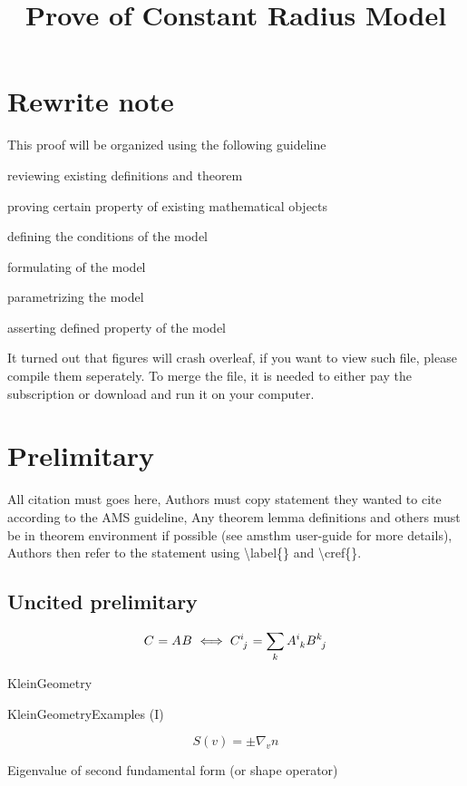 \documentclass[stu, babel, american, biblatex, a4paper, draftall]{apa7}
\title{Prove of Constant Radius Model}
\begin{document}
\maketitle
\tableofcontents

\section{Rewrite note}
This proof will be organized using the following guideline
\begin{APAenumerate}
    \item reviewing existing definitions and theorem
    \item proving certain property of existing mathematical objects
    \item defining the conditions of the model
    \item formulating of the model
    \item parametrizing the model
    \item asserting defined property of the model
\end{APAenumerate}
It turned out that figures will crash overleaf, if you want to view such file, please compile them seperately.
To merge the file, it is needed to either pay the subscription or download and run it on your computer.

\section{Prelimitary}
All citation must goes here,
Authors must copy statement they wanted to cite according to the AMS guideline,
Any theorem lemma definitions and others must be in theorem environment if possible (see amsthm user-guide for more details),
Authors then refer to the statement using {\textbackslash}label\{\} and {\textbackslash}cref\{\}.
\subsection{Uncited prelimitary}
\begin{equation}\label{MatrixMultiplication}
    \tensor{C}{}=\tensor{A}{}\tensor{B}{}
    \iff
    \tensor{C}{^i_j}=\sum_k\tensor{A}{^i_k}\tensor{B}{^k_j}
\end{equation}
\begin{definition}\label{KleinGeometry}
    KleinGeometry
\end{definition}
\begin{example}\label{KleinGeometryExample}
    KleinGeometryExamples (I)
\end{example}
\begin{example}\label{ShapeOperator}
    $$S\left(v\right)=\pm\nabla_v n$$
\end{example}
\begin{example}\label{PrincipalCurvature}
    Eigenvalue of second fundamental form (or shape operator)
\end{example}
\end{document}
